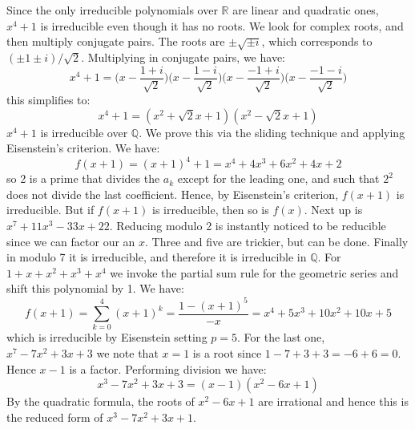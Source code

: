     \begin{solution}
        Since the only irreducible polynomials over $\mathbb{R}$ are linear
        and quadratic ones, $x^{4}+1$ is irreducible even though it has no
        roots. We look for complex roots, and then multiply conjugate pairs.
        The roots are $\pm\sqrt{\pm{i}}$, which corresponds to
        $(\pm{1}\pm{i})/\sqrt{2}$. Multiplying in conjugate pairs, we have:
        \begin{equation}
            x^{4}+1=\big(x-\frac{1+i}{\sqrt{2}}\big)
                    \big(x-\frac{1-i}{\sqrt{2}}\big)
                    \big(x-\frac{\minus{1}+i}{\sqrt{2}}\big)
                    \big(x-\frac{\minus{1}-i}{\sqrt{2}}\big)
        \end{equation}
        this simplifies to:
        \begin{equation}
            x^{4}+1=(x^{2}+\sqrt{2}x+1)(x^{2}-\sqrt{2}x+1)
        \end{equation}
        $x^{4}+1$ is irreducible over $\mathbb{Q}$. We prove this via the
        sliding technique and applying Eisenstein's criterion. We have:
        \begin{equation}
            f(x+1)=(x+1)^{4}+1
            =x^{4}+4x^{3}+6x^{2}+4x+2
        \end{equation}
        so 2 is a prime that divides the $a_{k}$ except for the leading one,
        and such that $2^{2}$ does not divide the last coefficient.
        Hence, by Eisenstein's criterion, $f(x+1)$ is irreducible. But if
        $f(x+1)$ is irreducible, then so is $f(x)$. Next up is
        $x^{7}+11x^{3}-33x+22$. Reducing modulo 2 is instantly noticed to be
        reducible since we can factor our an $x$. Three and five are
        trickier, but can be done. Finally in modulo 7 it is irreducible,
        and therefore it is irreducible in $\mathbb{Q}$. For
        $1+x+x^{2}+x^{3}+x^{4}$ we invoke the partial sum rule for the
        geometric series and shift this polynomial by 1. We have:
        \begin{equation}
            f(x+1)=\sum_{k=0}^{4}(x+1)^{k}=\frac{1-(x+1)^{5}}{\minus{x}}
            =x^{4}+5x^{3}+10x^{2}+10x+5
        \end{equation}
        which is irreducible by Eisenstein setting $p=5$. For the last one,
        $x^{7}-7x^{2}+3x+3$ we note that $x=1$ is a root since
        $1-7+3+3=\minus{6}+6=0$. Hence $x-1$ is a factor. Performing
        division we have:
        \begin{equation}
            x^{3}-7x^{2}+3x+3=(x-1)(x^{2}-6x+1)
        \end{equation}
        By the quadratic formula, the roots of $x^{2}-6x+1$ are irrational
        and hence this is the reduced form of $x^{3}-7x^{2}+3x+1$.
    \end{solution}
